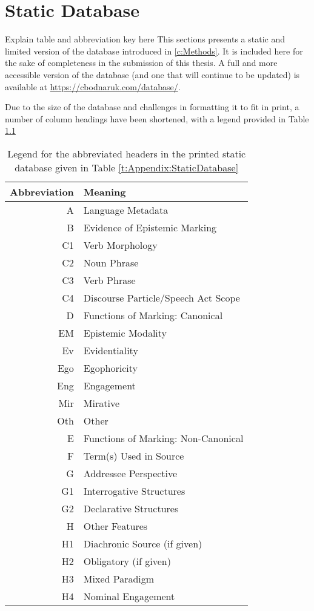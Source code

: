 \chapter{Static Database}\label{a:StaticDatabase}
Explain table and abbreviation key here
This sections presents a static and limited version of the database introduced in \cref{c:Methods}. It is included here for the sake of completeness in the submission of this thesis. A full and more accessible version of the database (and one that will continue to be updated) is available at \url{https://cbodnaruk.com/database/}.

Due to the size of the database and challenges in formatting it to fit in print, a number of column headings have been shortened, with a legend provided in Table \ref{t:Appendix:DatabaseLegend}
\begin{table}
       \centering
       \caption{Legend for the abbreviated headers in the printed static database given in Table \ref{t:Appendix:StaticDatabase}}\label{t:Appendix:DatabaseLegend}
       \begin{tabular}{r|l}
              Abbreviation & Meaning \\
              \hline
              A & Language Metadata \\
              \hline 
              B & Evidence of Epistemic Marking \\
              \hline 
              C1 & Verb Morphology \\
              C2 & Noun Phrase \\
              C3 & Verb Phrase \\
              C4 & Discourse Particle/Speech Act Scope \\
              \hline 
              D & Functions of Marking: Canonical \\
              EM & Epistemic Modality \\
              Ev & Evidentiality \\
              Ego & Egophoricity \\
              Eng & Engagement \\
              Mir & Mirative \\
              Oth & Other \\
              \hline 
              E & Functions of Marking: Non-Canonical \\
              \hline 
              F & Term(s) Used in Source \\
              \hline 
              G & Addressee Perspective \\
              G1 & Interrogative Structures \\
              G2 & Declarative Structures \\
              \hline 
              H & Other Features \\
              H1 & Diachronic Source (if given) \\
              H2 & Obligatory (if given) \\
              H3 & Mixed Paradigm \\
              H4 & Nominal Engagement \\ \hline
       \end{tabular}
\end{table} 
